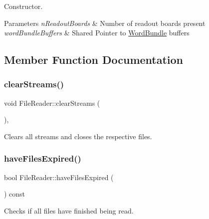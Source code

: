 Constructor. 


\begin{DoxyParams}{Parameters}
{\em n\+Readout\+Boards} & Number of readout boards present \\
\hline
{\em word\+Bundle\+Buffers} & Shared Pointer to \hyperlink{class_word_bundle}{Word\+Bundle} buffers \\
\hline
\end{DoxyParams}


\subsection{Member Function Documentation}
\mbox{\label{class_file_reader_abf01d994f77beae0653de481ea739ebb}} 
\subsubsection{\texorpdfstring{clear\+Streams()}{clearStreams()}}
{\footnotesize\ttfamily void File\+Reader\+::clear\+Streams (\begin{DoxyParamCaption}{ }\end{DoxyParamCaption})\hspace{0.3cm}{\ttfamily [inline]}, {\ttfamily [private]}}



Clears all streams and closes the respective files. 

\mbox{\label{class_file_reader_a58b80f2c9c2ec8381527bdfca1008007}} 
\subsubsection{\texorpdfstring{have\+Files\+Expired()}{haveFilesExpired()}}
{\footnotesize\ttfamily bool File\+Reader\+::have\+Files\+Expired (\begin{DoxyParamCaption}{ }\end{DoxyParamCaption}) const\hspace{0.3cm}{\ttfamily [inline]}}



Checks if all files have finished being read. 

